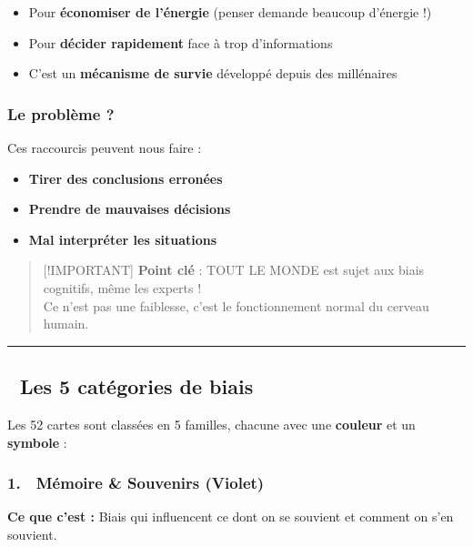 \documentclass[
]{article}
\providecommand{\tightlist}{%
  \setlength{\itemsep}{0pt}\setlength{\parskip}{0pt}}
\begin{document}
\begin{itemize}
\tightlist
\item
  Pour \textbf{économiser de l'énergie} (penser demande beaucoup
  d'énergie !)
\item
  Pour \textbf{décider rapidement} face à trop d'informations
\item
  C'est un \textbf{mécanisme de survie} développé depuis des millénaires
\end{itemize}

\subsubsection{Le problème ?}\label{le-probluxe8me}

Ces raccourcis peuvent nous faire :

\begin{itemize}
\tightlist
\item
  \textbf{Tirer des conclusions erronées}
\item
  \textbf{Prendre de mauvaises décisions}
\item
  \textbf{Mal interpréter les situations}
\end{itemize}

\begin{quote}
{[}!IMPORTANT{]} \textbf{Point clé} : TOUT LE MONDE est sujet aux biais
cognitifs, même les experts !\\
Ce n'est pas une faiblesse, c'est le fonctionnement normal du cerveau
humain.
\end{quote}

\begin{center}\rule{0.5\linewidth}{0.5pt}\end{center}

\subsection{🎨 Les 5 catégories de
biais}\label{les-5-catuxe9gories-de-biais}

Les 52 cartes sont classées en 5 familles, chacune avec une
\textbf{couleur} et un \textbf{symbole} :

\subsubsection{1. 🧠 Mémoire \& Souvenirs
(Violet)}\label{muxe9moire-souvenirs-violet}

\textbf{Ce que c'est :} Biais qui influencent ce dont on se souvient et
comment on s'en souvient.
\end{document}
